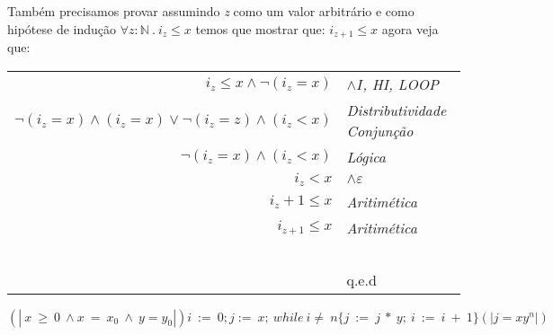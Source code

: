  Também precisamos provar assumindo \emph{z} como um valor arbitrário e como
 hipótese de indução $\forall z : \mathbb{N}\ .\ i_z \leq x$ temos que mostrar
 que: $i_{z+1} \leq x$ agora veja que:
 \begin{center}
     \begin{tabular}{rl}
         \emph{$i_z \leq x \land \neg(i_z = x) $}& \emph{$\land I$, HI, LOOP} \\
         \emph{$\neg(i_z=x) \land (i_z =x) \vee \neg(i_z=z) \land (i_z < x)$}&\emph{Distributividade Conjunção} \\
         \emph{$\neg(i_z =x) \land (i_z < x)$}& \emph{Lógica} \\
         \emph{$i_z < x$}& \emph{$\land \varepsilon$} \\
         \emph{$i_z +1 \leq x$}& \emph{Aritimética} \\
         \emph{$i_{z+1} \leq x$}& \emph{Aritimética} \\
         ~&~\\
         ~&q.e.d\\
     \end{tabular}
 \end{center}
$$(\!|\ x\ \geq\ 0\ \wedge x\ =\ x_0\ \wedge\ y=y_0|\!) i\ :=\ 0; j :=\ x;\
while\ i \neq\ n \{j\ :=\ j\ *\ y;\ i\ :=\ i\ +\ 1\}(\!| j=x y^n |\!) $$
